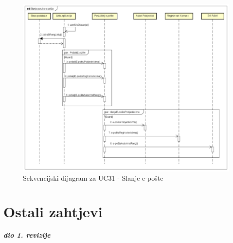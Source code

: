 				\newpage
				
				\begin{figure}[hp!]
					\includegraphics[width=\linewidth]{Slike/SD_SlanjeEPoste.png}
					\caption{Sekvencijski dijagram za UC31 - Slanje e-pošte}
				\end{figure}
				
				\newpage
				
				\eject
			
		\section{Ostali zahtjevi}
		
			\textbf{\textit{dio 1. revizije}}\\
		 

